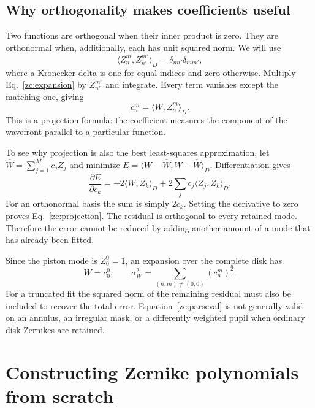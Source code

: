 \section{Why orthogonality makes coefficients useful}
Two functions are orthogonal when their inner product is zero. They are
orthonormal when, additionally, each has unit squared norm. We will use
\begin{equation}
 \langle Z_n^m,Z_{n'}^{m'}\rangle_D
       =\delta_{nn'}\delta_{mm'},
 \label{zc:orthonormal}
\end{equation}
where a Kronecker delta is one for equal indices and zero otherwise.
Multiply Eq.~\eqref{zc:expansion} by $Z_{n'}^{m'}$ and integrate. Every
term vanishes except the matching one, giving
\begin{equation}
 \boxed{c_n^m=\langle W,Z_n^m\rangle_D.}
 \label{zc:projection}
\end{equation}
This is a projection formula: the coefficient measures the component of
the wavefront parallel to a particular function.

To see why projection is also the best least-squares approximation,
let $\widehat W=\sum_{j=1}^M c_j Z_j$ and minimize
$E=\langle W-\widehat W,W-\widehat W\rangle_D$. Differentiation gives
\begin{equation}
 \frac{\partial E}{\partial c_k}
  =-2\langle W,Z_k\rangle_D+2\sum_jc_j\langle Z_j,Z_k\rangle_D.
\end{equation}
For an orthonormal basis the sum is simply $2c_k$. Setting the derivative
to zero proves Eq.~\eqref{zc:projection}. The residual is orthogonal to
every retained mode. Therefore the error cannot be reduced by adding
another amount of a mode that has already been fitted.

Since the piston mode is $Z_0^0=1$, an expansion over the complete disk
has
\begin{equation}
 \overline W=c_0^0,\qquad
 \sigma_W^2=\sum_{(n,m)\ne(0,0)}(c_n^m)^2.
 \label{zc:parseval}
\end{equation}
For a truncated fit the squared norm of the remaining residual must also
be included to recover the total error. Equation~\eqref{zc:parseval} is
not generally valid on an annulus, an irregular mask, or a differently
weighted pupil when ordinary disk Zernikes are retained.

\chapter{Constructing Zernike polynomials from scratch}
\label{zc:construction}

